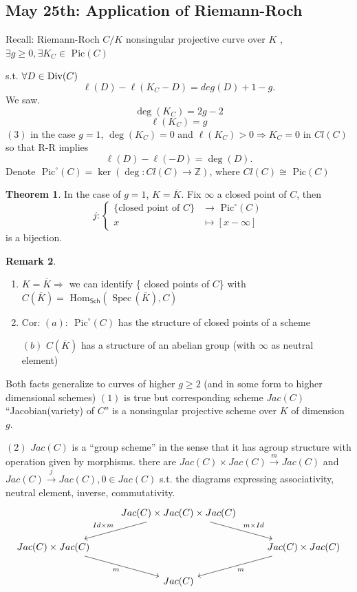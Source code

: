 \documentclass[11pt]{article}
\theoremstyle{definition}
\newtheorem{thm}{Theorem}[section]
\newtheorem{rmk}[thm]{Remark}
\renewcommand{\hom}{\text{ Hom}}
\newcommand{\pic}{\text{ Pic}}
\newcommand{\spec}{\text{ Spec}\,}
\newcommand{\intg}{\mathbb Z}
\newcommand{\Div}{\textnormal{Div}}
\newcommand{\Lrta}{\Longrightarrow}
\newcommand{\lrta}{\longrightarrow}
\begin{document}
\subsection{May 25th: Application of Riemann-Roch}

Recall:
Riemann-Roch $C/K$ nonsingular projective curve over $K$ , $\exists g\geq 0,\exists K_C\in  \pic(C)$

s.t. $\forall D\in \Div(C)$
$$
\ell(D)-\ell (K_C-D)=deg(D)+1-g.
$$
We saw. 
$$
\deg(K_C)=2g-2
$$
$$
\ell(K_C)=g
$$
$(3)$ in the case  $g=1$, $\deg(K_C)=0$ and $\ell(K_C)>0\Lrta K_C=0$ in $Cl(C)$ so that R-R
implies
$$
\ell(D)-\ell(-D)=\deg(D).
$$
Denote $\pic^\circ(C)=\ker(\deg:Cl(C)\lrta\intg)$, where $Cl(C)\cong \pic (C)$
\begin{thm}\label{chap7thm:correspondence_closed_point_Pic0} In the case of $g=1$,
$K=\overline{K}$. Fix $\infty$ a closed point of $C$, then 
$$
j:\left\{\begin{aligned}
\{\text{closed point of $C$}\}&\lrta\pic^\circ(C)\\
x & \longmapsto [x-\infty]
\end{aligned}\right.
$$
is a bijection.

\end{thm}
\begin{rmk}\ 
\begin{enumerate}[label=(\arabic*)]
\item $K=\overline{K}\Lrta $ we can identify \{ closed points of $C$\} with 
$C(\overline{K})=\hom_{\mathsf{Sch}}(\spec(\overline{K}),C)$
\item Cor: $(a)$: $\pic^\circ(C)$ has the structure of closed points of a scheme

$(b)$ $C(\overline{K})$ has  a structure of an abelian group (with $\infty$ as neutral element)
\end{enumerate}
\end{rmk}
Both  facts generalize to curves of higher $g\geq 2$ (and in some form to higher dimensional schemes) $(1)$ is true but corresponding scheme $Jac(C)$ ``Jacobian(variety) of  $C$'' is a nonsingular projective scheme over $K$ of dimension $g$.

$(2)$ $Jac(C)$ is a ``group scheme'' in the sense that it has agroup structure with operation given by morphisms. there are $Jac(C)\times Jac(C)\overset{m}{\lrta} Jac(C)$ and $Jac(C)\overset{j}{\lrta}Jac(C), 0\in Jac(C)$ s.t. the diagrams expressing associativity, neutral element, inverse, commutativity.
$$
\begin{tikzcd}
 & Jac(C)\times Jac(C)\times Jac(C) \arrow[ld, "Id\times m"'] \arrow[rd, "m\times Id"] &  \\
Jac(C)\times Jac(C) \arrow[rd, "m"'] &  & Jac(C)\times Jac(C) \arrow[ld, "m"] \\
 & Jac(C) & 
\end{tikzcd}
$$
\end{document}
